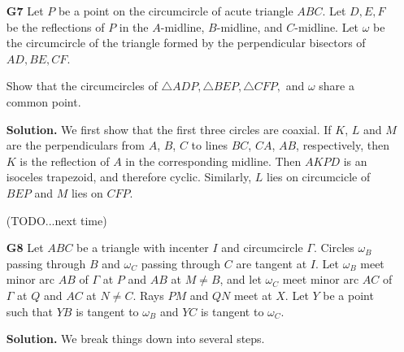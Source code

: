 \documentclass[11pt,a4paper]{article}
\begin{document}
\begin{enumerate}
	\item [\textbf{G7}] Let $P$ be a point on the circumcircle of acute triangle $ABC$. Let $D,E,F$ be the reflections of $P$ in the $A$-midline, $B$-midline, and $C$-midline. Let $\omega$ be the circumcircle of the triangle formed by the perpendicular bisectors of $AD, BE, CF$.
	
	Show that the circumcircles of $\triangle ADP, \triangle BEP, \triangle CFP,$ and $\omega$ share a common point.
	
	\textbf{Solution.} We first show that the first three circles are coaxial. If $K$, $L$ and $M$ are the perpendiculars from $A$, $B$, $C$ to lines $BC$, $CA$, $AB$, respectively, then $K$ is the reflection of $A$ in the corresponding midline. Then $AKPD$ is an isoceles trapezoid, and therefore cyclic. 
	Similarly, $L$ lies on circumcicle of $BEP$ and $M$ lies on $CFP$. 
	
	(TODO...next time)
	
	\item [\textbf{G8}]
	Let $ABC$ be a triangle with incenter $I$ and circumcircle $\Gamma$. Circles $\omega_{B}$ passing through $B$ and $\omega_{C}$ passing through $C$ are tangent at $I$. Let $\omega_{B}$ meet minor arc $AB$ of $\Gamma$ at $P$ and $AB$ at $M\neq B$, and let $\omega_{C}$ meet minor arc $AC$ of $\Gamma$ at $Q$ and $AC$ at $N\neq C$. Rays $PM$ and $QN$ meet at $X$. Let $Y$ be a point such that $YB$ is tangent to $\omega_{B}$ and $YC$ is tangent to $\omega_{C}$.
	
	\textbf{Solution.} 
	We break things down into several steps. 
	

\end{enumerate}
\end{document}
